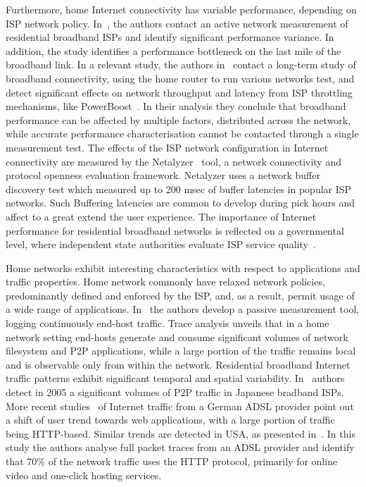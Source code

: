 Furthermore, home Internet connectivity has variable performance, depending on
ISP network policy.
In~\cite{Dischinger2007}, the authors contact an active network measurement of
residential broadband ISPs and identify significant performance variance.
In addition,  the study identifies a performance bottleneck
on the last mile of the broadband link.  In a relevant study, the authors
in~\cite{Sundaresan2011} contact a long-term study of broadband connectivity,
using the home router to run various networks test, and detect significant
effects on network throughput and latency from ISP throttling mechanisms, like
PowerBoost~\cite{powerboost}. In their analysis they conclude that broadband
performance can be affected by multiple factors, distributed  across the
network, while accurate performance characterisation cannot be contacted through
a single measurement test.  The effects of the ISP network configuration in
Internet connectivity are measured by the Netalyzer~\cite{Kreibich10} tool, a
network connectivity and protocol openness evaluation framework.  Netalyzer uses
a network buffer discovery test which measured up to 200 msec of buffer
latencies in popular ISP networks. Such Buffering latencies are common to
develop during pick hours and affect to a great extend the user experience. 
The importance of Internet performance for residential broadband networks is
reflected on a governmental level, where independent state authorities evaluate
ISP service quality~\cite{fcc, ofcom}.  

Home networks exhibit interesting characteristics with respect to applications
and traffic properties. Home network commonly have relaxed network policies,
predominantly defined and enforced by the ISP, and, as a result, permit usage of
a wide range of applications.  In~\cite{Reggani12} the authors develop a passive
measurement tool, logging continuously end-host traffic.  Trace analysis unveils
that in a home network setting end-hosts generate and consume significant
volumes of network filesystem and P2P applications, while a large portion of the
traffic remains local and is observable only from within the network.
Residential broadband Internet traffic patterns exhibit significant temporal and
spatial variability.  In~\cite{Cho2006} authors detect in 2005 a significant
volumes of P2P traffic in Japanese bradband ISPs.  More recent
studies~\cite{Maier2009} of Internet traffic from a German ADSL provider point
out a shift of user trend towards web applications, with a large portion of
traffic being HTTP-based. Similar trends are detected in USA,  as presented
in~\cite{Erman2011}. In this study the authors analyse full packet traces from
an ADSL provider and identify that 70\% of the network traffic uses the HTTP
protocol, primarily for online video and one-click hosting services. 

